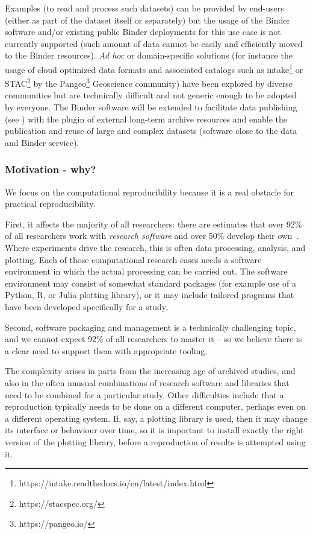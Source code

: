\begin{compactitem}
      Examples (to read and process such datasets) can be provided by end-users (either as part of the dataset
      itself or separately) but the usage of the Binder software and/or existing public Binder deployments for
      this use case is not currently supported (such amount of data cannot be easily and efficiently moved to
      the Binder resources). \emph{Ad hoc} or domain-specific solutions (for instance the usage of cloud optimized
      data formats and associated catalogs such as intake\footnote{https://intake.readthedocs.io/en/latest/index.html}
      or STAC\footnote{https://stacspec.org/} by the Pangeo\footnote{https://pangeo.io/} Geoscience community)
      have been explored by diverse communities but are technically difficult and not generic enough to be
      adopted by everyone. The Binder software will be extended to facilitate data publishing (see ) with
      the plugin of external long-term archive resources and enable the publication and reuse of large and complex datasets (software close to
      the data and Binder service).
\end{compactitem}


\subsubsection{Motivation - why?}\label{sec:motivation-why}

We focus on the computational reproducibility because it is a real
obstacle for practical reproducibility.

First, it affects the majority of all researchers: there are estimates that over
92\% of all researchers work with \emph{research software} and over 50\% develop
their own~\cite{Hettrick2014}. Where experiments drive the research, this is
often data processing, analysis, and plotting. Each of those computational
research cases needs a software environment in which the actual processing can
be carried out. The software environment may consist of somewhat standard
packages (for example use of a Python, R, or Julia plotting library), or it may
include tailored programs that have been developed specifically for a study.

Second, software packaging and management is a technically challenging topic,
and we cannot expect 92\% of all researchers to master it -- so we believe there
is a clear need to support them with appropriate tooling.

The complexity arises in parts from the increasing age of archived studies, and
also in the often unusual combinations of research software and libraries that
need to be combined for a particular study. Other difficulties include that a
reproduction typically needs to be done on a different computer, perhaps even on
a different operating system. If, say, a plotting library is used, then it may
change its interface or behaviour over time, so it is important to install
exactly the right version of the plotting library, before a reproduction of
results is attempted using it.

